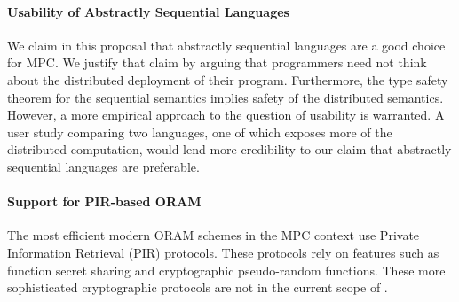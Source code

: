 \paragraph{Usability of Abstractly Sequential Languages}
We claim in this proposal that abstractly sequential languages are a good choice for MPC. We justify that claim by arguing that
programmers need not think about the distributed deployment of their program. Furthermore, the type safety theorem for the sequential
semantics implies safety of the distributed semantics. However, a more empirical approach to the question of usability is warranted.
A user study comparing two languages, one of which exposes more of the distributed computation, would lend more credibility to our claim
that abstractly sequential languages are preferable.

\paragraph{Support for PIR-based ORAM}
The most efficient modern ORAM schemes in the MPC context use Private Information Retrieval (PIR) protocols. These protocols rely on
features such as function secret sharing and cryptographic pseudo-random functions. These more sophisticated cryptographic protocols
are not in the current scope of \lang.
